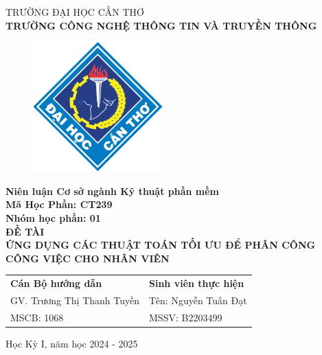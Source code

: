 \begin{titlepage}
  \begin{center}
    \vspace{-6pt}TRƯỜNG ĐẠI HỌC CẦN THƠ \\
    \textbf{\fontsize{16pt}{0pt}\selectfont TRƯỜNG CÔNG NGHỆ THÔNG TIN VÀ TRUYỀN THÔNG}
    \begin{figure}[H]
      \centering
      \includegraphics[width=5cm]{images/logo-ctu.png}
    \end{figure}
    \textbf{Niên luận Cơ sở ngành Kỹ thuật phần mềm} \\
    \textbf{Mã Học Phần: CT239} \\
    \textbf{Nhóm học phần: 01} \\
    \vspace{3.5cm}
    \textbf{\fontsize{16pt}{0pt}\selectfont ĐỀ TÀI} \\
    \textbf{\fontsize{18pt}{0pt}\selectfont ỨNG DỤNG CÁC THUẬT TOÁN TỐI ƯU ĐỂ PHÂN CÔNG CÔNG VIỆC CHO NHÂN VIÊN} \\
    \vspace{4.5cm}
    \newcommand{\MyIndent}{\hspace{1cm}}
    \begin{tabular}{p{8cm} l}
      \textbf{Cán Bộ hướng dẫn}         & \textbf{Sinh viên thực hiện}  \\
      \MyIndent GV. Trương Thị Thanh Tuyền & \MyIndent Tên: Nguyễn Tuấn Đạt \\
      \MyIndent MSCB: 1068                 & \MyIndent MSSV: B2203499
    \end{tabular}


    \vspace{1.5cm}
    \fontsize{14pt}{0pt}\selectfont Học Kỳ I, năm học 2024 - 2025
  \end{center}
\end{titlepage}
\cleardoublepage